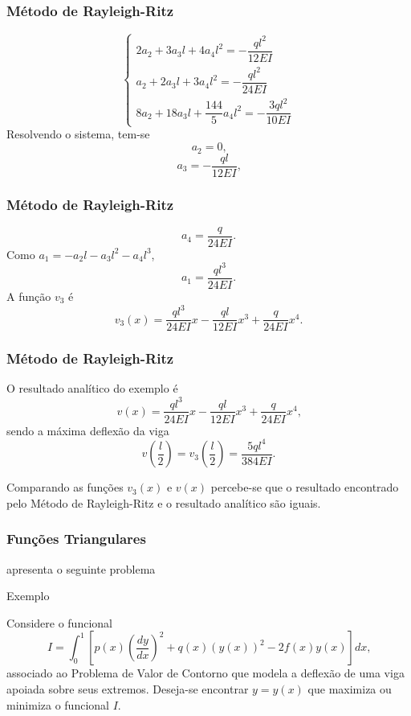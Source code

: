 \documentclass{beamer}
\begin{document}
	\begin{frame}
		\frametitle{Método de Rayleigh-Ritz}
		\justify
		
		$$
			\begin{cases}
				2a_2 + 3a_3l + 4a_4l^2 = -\dfrac{ql^2}{12EI}\\[10pt]
				a_2 + 2a_3 l + 3a_4 l^2 = - \dfrac{ql^2}{24EI}\\[10pt]
				8a_2 + 18a_3 l + \dfrac{144}{5} a_4 l^2 =-\dfrac{3ql^2}{10EI}
			\end{cases}
		$$
		\pause
		Resolvendo o sistema, tem-se
		$$
			a_2 = 0
			\text{,}
		$$
		\pause
		$$
			a_3 = -\frac{ql}{12EI}
			\text{,}
		$$
	\end{frame}
	
	\begin{frame}
		\frametitle{Método de Rayleigh-Ritz}
		\justify
	
		$$
			a_4 = \frac{q}{24EI}
			\text{.}
		$$
		\pause
		Como $a_1=-a_2l - a_3l^2-a_4l^3$,
		$$
			a_1 = \frac{ql^3}{24EI}
			\text{.}
		$$
		\pause
		A função $v_3$ é
		$$
			v_3(x)=
			\frac{ql^3}{24EI} x
			-
			\frac{ql}{12EI} x^3
			+
			\frac{q}{24EI} x^4
			\text{.}
		$$
	\end{frame}
	
	\begin{frame}
		\frametitle{Método de Rayleigh-Ritz}
		\justify
		
		O resultado analítico do exemplo é
		$$
			v(x)=\frac{ql^3}{24EI}x - \frac{ql}{12EI}x^3 + \frac{q}{24EI}x^4
			\text{,}
		$$
		\pause
		sendo a máxima deflexão da viga
		$$
			v\left (\frac{l}{2}\right )
			=
			v_3\left (\frac{l}{2}\right )
			= \frac{5ql^4}{384EI}
			\text{.}
		$$
		\pause
		
		Comparando as funções $v_3(x)$ e $v(x)$ percebe-se que o resultado encontrado pelo Método de Rayleigh-Ritz e o resultado analítico são iguais.
	\end{frame}
	
	\begin{frame}
		\frametitle{Funções Triangulares}
		\justify
		
		 apresenta o seguinte problema
		\begin{block}{Exemplo}
			\justify
			
			Considere o funcional
			$$
				I = \int_{0}^{1} \left [ 
					p(x) \left ( 
						\frac{dy}{dx}
					\right )^2
					+ q(x)(y(x))^2 
					- 2f(x)y(x) 
				\right ] dx
				\text{,}
			$$
			associado ao Problema de Valor de Contorno que modela a deflexão de uma viga apoiada sobre seus extremos. Deseja-se encontrar $y=y(x)$ que maximiza ou minimiza o funcional $I$.
		\end{block}
	\end{frame}
	
\end{document}
